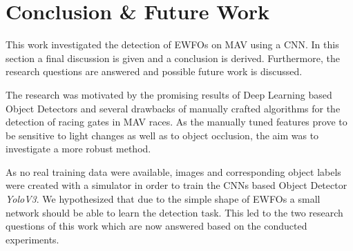 \chapter{Conclusion \& Future Work}
\label{sec:conclusion}
This work investigated the detection of \acp{EWFO} on \ac{MAV} using a \ac{CNN}. In this section a final discussion is given and a conclusion is derived. Furthermore, the research questions are answered and possible future work is discussed.

The research was motivated by the promising results of Deep Learning based Object Detectors and several drawbacks of manually crafted algorithms for the detection of racing gates in \ac{MAV} races. As the manually tuned features prove to be sensitive to light changes as well as to object occlusion, the aim was to investigate a more robust method. 

As no real training data were available, images and corresponding object labels were created with a simulator in order to train the \acp{CNN} based Object Detector \textit{YoloV3}. We hypothesized that due to the simple shape of \acp{EWFO} a small network should be able to learn the detection task. This led to the two research questions of this work which are now answered based on the conducted experiments.

